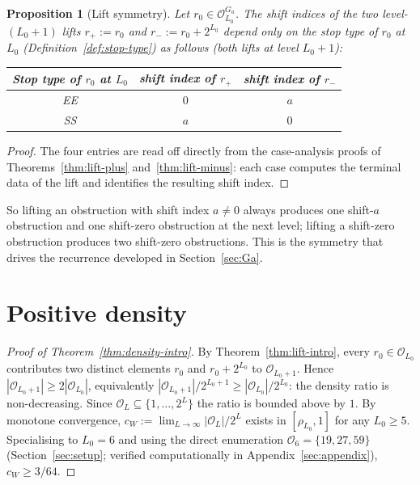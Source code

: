 \documentclass[11pt,reqno]{amsart}
\theoremstyle{plain}
\newtheorem{proposition}[theorem]{Proposition}
\theoremstyle{definition}
\theoremstyle{remark}
\newcommand{\Obs}{\mathcal{O}}
\begin{document}
\begin{proposition}[Lift symmetry]\label{prop:lift-symmetry}
Let $r_0 \in \Obs_{L_0}^{G_a}$. The shift indices of the two level-$(L_0+1)$
lifts $r_+ := r_0$ and $r_- := r_0 + 2^{L_0}$ depend only on the stop type
of $r_0$ at $L_0$ (Definition~\ref{def:stop-type}) as follows (both lifts
at level $L_0+1$):

\begin{center}
\begin{tabular}{c|cc}
\toprule
Stop type of $r_0$ at $L_0$ & shift index of $r_+$ & shift index of $r_-$ \\
\midrule
EE & $0$ & $a$ \\
SS & $a$ & $0$ \\
\bottomrule
\end{tabular}
\end{center}
\end{proposition}

\begin{proof}
The four entries are read off directly from the case-analysis proofs of
Theorems~\ref{thm:lift-plus} and~\ref{thm:lift-minus}: each case
computes the terminal data of the lift and identifies the resulting
shift index. \qedhere
\end{proof}

So lifting an obstruction with shift index $a \ne 0$ always produces one
shift-$a$ obstruction and one shift-zero obstruction at the next level;
lifting a shift-zero obstruction produces two shift-zero obstructions.
This is the symmetry that drives the recurrence developed in
Section~\ref{sec:Ga}.

\section{Positive density}
\label{sec:density}

\begin{proof}[Proof of Theorem~\ref{thm:density-intro}]
By Theorem~\ref{thm:lift-intro}, every $r_0 \in \Obs_{L_0}$ contributes two
distinct elements $r_0$ and $r_0 + 2^{L_0}$ to $\Obs_{L_0+1}$. Hence
$|\Obs_{L_0+1}| \ge 2 |\Obs_{L_0}|$, equivalently
$|\Obs_{L_0+1}|/2^{L_0+1} \ge |\Obs_{L_0}|/2^{L_0}$: the density ratio is
non-decreasing. Since $\Obs_L \subseteq \{1, \ldots, 2^L\}$ the ratio is
bounded above by $1$. By monotone convergence,
$c_W := \lim_{L \to \infty} |\Obs_L|/2^L$ exists in $[\rho_{L_0}, 1]$ for any
$L_0 \ge 5$. Specialising to $L_0 = 6$ and using the direct enumeration
$\Obs_6 = \{19, 27, 59\}$ (Section~\ref{sec:setup}; verified computationally
in Appendix~\ref{sec:appendix}), $c_W \ge 3/64$. \qedhere
\end{proof}
\end{document}
